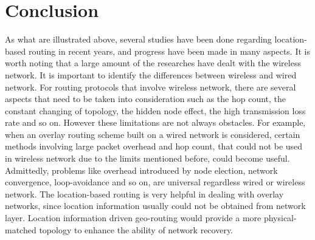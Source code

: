 \documentclass[conference]{IEEEtran}
\begin{document}

\section{Conclusion}
\label{conclusion}
As what are illustrated above, several studies have been done regarding location-based routing in recent years, and progress have been made in many aspects. 
%
It is worth noting that a large amount of the researches have dealt with the wireless network. It is important to identify the differences between wireless and wired network. For routing protocols that involve wireless network, there are several aspects that need to be taken into consideration
such as the hop count, the constant changing of topology, the hidden node effect, the high transmission loss rate and so on. However these limitations are not always obstacles. For example, when an overlay routing scheme built on a wired network is considered, certain methods involving large packet overhead and hop count, that could not be used in wireless network due to the limits mentioned before, could become useful.  Admittedly, problems like overhead introduced by node election, network convergence, loop-avoidance and so on, are universal regardless wired or wireless network. 
%
The location-based routing is very helpful in dealing with overlay networks, since location information usually could not be obtained from network layer. Location information driven geo-routing would provide a more physical-matched topology to enhance the ability of network recovery.




%
%
\end{document}
